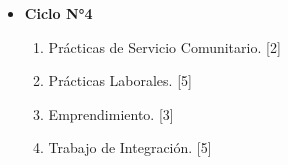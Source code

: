 \documentclass{article}
\begin{document}
\begin{itemize}
        \item \textbf{Ciclo N°4}
            \begin{enumerate} [start=19]
                \item Prácticas de Servicio Comunitario. [2]
                \item Prácticas Laborales. [5]
                \item Emprendimiento. [3]
                \item Trabajo de Integración. [5]
            \end{enumerate}

    \end{itemize}
\end{document}
